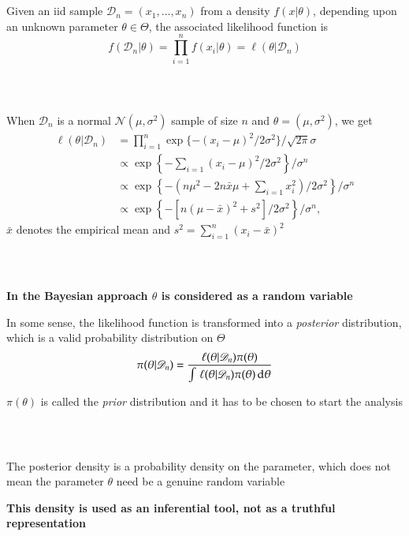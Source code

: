 \documentclass[notes,professionalfont,11pt,usenames,dvipsnames]{beamer}
\renewcommand{\mathcal}{\mathscr}
\renewcommand{\mathcal}{\mathscr}
\newcommand\justify{\rightskip0pt \leftskip0pt}
\newenvironment{slide}
{\begin{frame}[environment=slide]
\frametitle{\insertsection \\ \insertsubsection}\justify\setlength{\parskip}{0.5cm}\vspace{-1cm}}
{\end{frame}}
\begin{document}
\begin{slide}

Given an iid sample $\mathcal{D}_n=(x_1,\ldots,x_n)$
from a density $f(x|\theta)$, depending upon an unknown parameter
$\theta\in\Theta$, the associated likelihood function is
$$
f(\mathcal{D}_n|\theta) = \prod_{i=1}^n f(x_i|\theta) = \ell(\theta|\mathcal{D}_n)
$$

\end{slide}

\begin{slide}

When $\mathcal{D}_n$ is a normal $\mathcal{N}(\mu,\sigma^2)$ sample of size $n$ and
$\theta=(\mu,\sigma^2)$, we get
\begin{align*}
\ell(\theta|\mathcal{D}_n) &= \prod_{i=1}^n \exp\{ -(x_i-\mu)^2/2\sigma^2 \} / \sqrt{2\pi}\sigma \\
&\propto \exp\left\{ -\sum_{i=1} (x_i-\mu)^2/2\sigma^2 \right\}/\sigma^n \\
&\propto \exp\left\{ - \left(n \mu^2 -2n\bar x\mu + \sum_{i=1} x_i^2 \right)\big/ 2\sigma^2 \right\}/\sigma^n \\
&\propto \exp\left\{ - \left[n (\mu -\bar x)^2 + s^2 \right]\big/ 2\sigma^2 \right\}/\sigma^n,
\end{align*}
$\bar x$ denotes the empirical mean and $s^2=\sum_{i=1}^n  (x_i-\bar x)^2$

\end{slide}

\begin{slide}

{\color{red}\bf In the Bayesian approach $\theta$ is considered as a random variable}

In some sense, the likelihood function
is transformed into a {\em posterior} distribution, which is a 
valid probability distribution on $\Theta$ 
$$
\pi(\theta|\mathcal{D}_n) = \frac{\ell(\theta|\mathcal{D}_n)\pi(\theta)}{
\int\,\ell(\theta|\mathcal{D}_n)\pi(\theta)\,\hbox{d}\theta}
$$

$\pi(\theta)$ is called the {\em prior} distribution and it has to be chosen 
to start the analysis

\end{slide}

\begin{slide}

The posterior density is a probability density on the parameter, which does not mean the parameter $\theta$ 
need be a genuine random variable

{\color{red}\bf This density is used as an inferential tool,
not as a truthful representation}

\end{slide}
\end{document}

